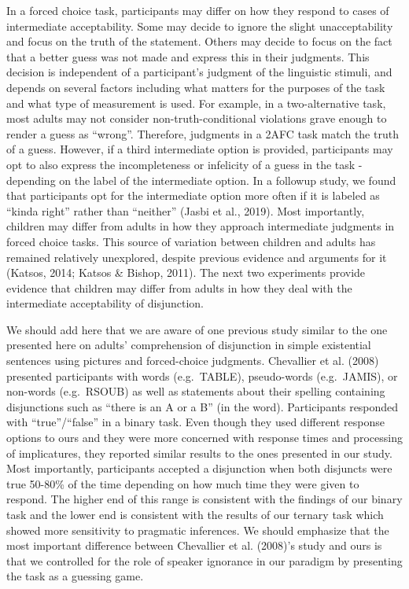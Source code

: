 \documentclass[
  english,
  ,man,floatsintext]{apa6}
\begin{document}
In a forced choice task, participants may differ on how they respond to cases of intermediate acceptability. Some may decide to ignore the slight unacceptability and focus on the truth of the statement. Others may decide to focus on the fact that a better guess was not made and express this in their judgments. This decision is independent of a participant's judgment of the linguistic stimuli, and depends on several factors including what matters for the purposes of the task and what type of measurement is used. For example, in a two-alternative task, most adults may not consider non-truth-conditional violations grave enough to render a guess as \enquote{wrong}. Therefore, judgments in a 2AFC task match the truth of a guess. However, if a third intermediate option is provided, participants may opt to also express the incompleteness or infelicity of a guess in the task - depending on the label of the intermediate option. In a followup study, we found that participants opt for the intermediate option more often if it is labeled as \enquote{kinda right} rather than \enquote{neither} (Jasbi et al., 2019). Most importantly, children may differ from adults in how they approach intermediate judgments in forced choice tasks. This source of variation between children and adults has remained relatively unexplored, despite previous evidence and arguments for it (Katsos, 2014; Katsos \& Bishop, 2011). The next two experiments provide evidence that children may differ from adults in how they deal with the intermediate acceptability of disjunction.

We should add here that we are aware of one previous study similar to the one presented here on adults' comprehension of disjunction in simple existential sentences using pictures and forced-choice judgments. Chevallier et al. (2008) presented participants with words (e.g.~TABLE), pseudo-words (e.g.~JAMIS), or non-words (e.g.~RSOUB) as well as statements about their spelling containing disjunctions such as \enquote{there is an A or a B} (in the word). Participants responded with \enquote{true}/\enquote{false} in a binary task. Even though they used different response options to ours and they were more concerned with response times and processing of implicatures, they reported similar results to the ones presented in our study. Most importantly, participants accepted a disjunction when both disjuncts were true 50-80\% of the time depending on how much time they were given to respond. The higher end of this range is consistent with the findings of our binary task and the lower end is consistent with the results of our ternary task which showed more sensitivity to pragmatic inferences. We should emphasize that the most important difference between Chevallier et al. (2008)'s study and ours is that we controlled for the role of speaker ignorance in our paradigm by presenting the task as a guessing game.
\end{document}
